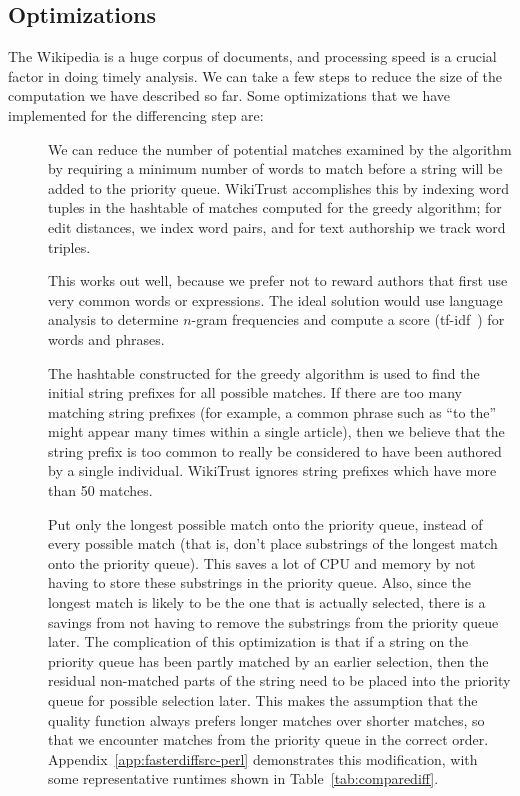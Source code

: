 \subsection{Optimizations}
\label{sec:diff-optimizations}

The Wikipedia is a huge corpus of documents, and processing speed
is a crucial factor in doing timely analysis.
We can take a few steps to reduce the size of the computation
we have described so far.
Some optimizations that we have implemented for the differencing
step are:
%
\begin{description}
\item[]
    We can reduce the number of potential matches examined
    by the algorithm by requiring a minimum number of words to match
    before a string will be added to the priority queue.
    WikiTrust accomplishes this by indexing word tuples in the
    hashtable of matches computed for the greedy algorithm;
    for edit distances, we index word pairs, and for text authorship
    we track word triples.

    This works out well, because we prefer not to reward authors that
    first use very common words or expressions.
    The ideal solution would use language analysis to determine
    $n$-gram frequencies and compute
    a score (\eg tf-idf~\cite{Jones1972}) for words and phrases.


\item[]
    The hashtable constructed for the greedy algorithm is used
    to find the initial string prefixes for all possible matches.
    If there are too many matching string prefixes (for example,
    a common phrase such as ``to the'' might appear many times
    within a single article), then we believe that the string prefix
    is too common to really be considered to have been authored
    by a single individual.
    WikiTrust ignores string prefixes which have more than 50 matches.

\item[] Put only the longest possible match
    onto the priority queue, instead of every possible match (that is, don't
    place substrings of the longest match onto the priority queue).
    This saves a lot of CPU and memory by not having to store
    these substrings in the priority queue.
    Also, since the longest match is likely to be the one that is
    actually selected, there is a savings from not having to remove
    the substrings from the priority queue later.
    The complication of this optimization is that if a string on
    the priority queue has been partly matched by an earlier selection,
    then the residual non-matched parts of the string need to
    be placed into the priority queue for possible selection later.
    This makes the assumption that the quality function always
    prefers longer matches over shorter matches, so that we encounter
    matches from the priority queue in the correct order.
    Appendix~\ref{app:fasterdiffsrc-perl} demonstrates this
    modification, with some representative runtimes shown
    in Table~\ref{tab:comparediff}.


\end{description}
